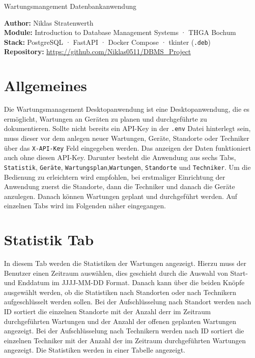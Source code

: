 \documentclass[11pt,a4paper]{article}
\begin{document}
\thispagestyle{empty}
%
{Wartungsmangement Datenbankanwendung}%

\begin{infobox}
\textbf{Author:} Niklas Stratenwerth  \\
\textbf{Module:} Introduction to Database Management Systems · THGA Bochum \\
\textbf{Stack:} PostgreSQL · FastAPI · Docker Compose · tkinter (\texttt{.deb}) \\
\textbf{Repository:} \url{https://github.com/Niklas0511/DBMS_Project} \\
\end{infobox}

\tableofcontents
\vspace{1em}

\section{Allgemeines}

Die Wartungsmanagement Desktopanwendung ist eine Desktopanwendung, die es ermöglicht, Wartungen an Geräten zu planen und durchgeführte 
zu dokumentieren. Sollte nicht bereits ein API-Key in der \texttt{.env} Datei hinterlegt sein, muss dieser vor dem anlegen neuer Wartungen, Geräte, Standorte oder Techniker
über das {\texttt{X-API-Key}} Feld eingegeben werden. Das anzeigen der Daten funktioniert auch ohne diesen API-Key.
Darunter besteht die Anwendung aus sechs Tabs, {\texttt{Statistik}}, {\texttt{Geräte}}, {\texttt{Wartungsplan}},{\texttt{Wartungen}}, {\texttt{Standorte}} und {\texttt{Techniker}}.
Um die Bedienung zu erleichtern wird empfohlen, bei erstmaliger Einrichtung der Anwendung zuerst die Standorte, dann die Techniker und danach die Geräte anzulegen. 
Danach können Wartungen geplant und durchgeführt werden.
Auf einzelnen Tabs wird im Folgenden näher eingegangen.

\section{Statistik Tab}

In diesem Tab werden die Statistiken der Wartungen angezeigt. Hierzu muss der Benutzer einen Zeitraum auswählen, dies geschieht
durch die Auswahl von Start- und Enddatum im JJJJ-MM-DD Format. Danach kann über die beiden Knöpfe ausgewählt werden, ob die Statistiken nach Standorten oder nach Technikern
aufgeschlüsselt werden sollen. Bei der Aufschlüsselung nach Standort werden nach ID sortiert die einzelnen Standorte mit der Anzahl derr im Zeitraum durchgeführten Wartungen
und der Anzahl der offenen geplanten Wartungen angezeigt. 
Bei der Aufschlüsselung nach Technikern werden nach ID sortiert die einzelnen Techniker mit der Anzahl der im Zeitraum durchgeführten Wartungen
angezeigt. Die Statistiken werden in einer Tabelle angezeigt.
\end{document}
